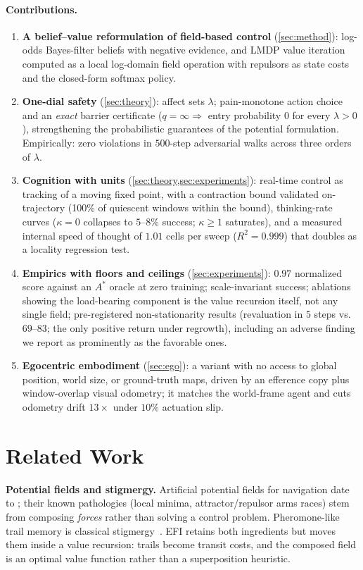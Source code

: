 \documentclass[11pt]{article}
\begin{document}
\paragraph{Contributions.}
\begin{enumerate}
  \item \textbf{A belief--value reformulation of field-based control} (\cref{sec:method}): log-odds Bayes-filter beliefs with negative evidence, and LMDP value iteration computed as a local log-domain field operation with repulsors as state costs and the closed-form softmax policy.
  \item \textbf{One-dial safety} (\cref{sec:theory}): affect sets $\lambda$; pain-monotone action choice and an \emph{exact} barrier certificate ($q{=}\infty \Rightarrow$ entry probability $0$ for every $\lambda>0$), strengthening the probabilistic guarantees of the potential formulation. Empirically: zero violations in $500$-step adversarial walks across three orders of $\lambda$.
  \item \textbf{Cognition with units} (\cref{sec:theory,sec:experiments}): real-time control as tracking of a moving fixed point, with a contraction bound validated on-trajectory (100\% of quiescent windows within the bound), thinking-rate curves ($\kappa{=}0$ collapses to $5$--$8\%$ success; $\kappa{\ge}1$ saturates), and a measured internal speed of thought of $1.01$ cells per sweep ($R^2=0.999$) that doubles as a locality regression test.
  \item \textbf{Empirics with floors and ceilings} (\cref{sec:experiments}): $0.97$ normalized score against an $A^\ast$ oracle at zero training; scale-invariant success; ablations showing the load-bearing component is the value recursion itself, not any single field; pre-registered non-stationarity results (revaluation in $5$ steps vs.\ $69$--$83$; the only positive return under regrowth), including an adverse finding we report as prominently as the favorable ones.
  \item \textbf{Egocentric embodiment} (\cref{sec:ego}): a variant with no access to global position, world size, or ground-truth maps, driven by an efference copy plus window-overlap visual odometry; it matches the world-frame agent and cuts odometry drift $13\times$ under $10\%$ actuation slip.
\end{enumerate}

\section{Related Work}
\label{sec:related}
\textbf{Potential fields and stigmergy.} Artificial potential fields for navigation date to \citet{khatib1986}; their known pathologies (local minima, attractor/repulsor arms races) stem from composing \emph{forces} rather than solving a control problem. Pheromone-like trail memory is classical stigmergy~\citep{dorigo1996}. EFI retains both ingredients but moves them inside a value recursion: trails become transit costs, and the composed field is an optimal value function rather than a superposition heuristic.
\end{document}
